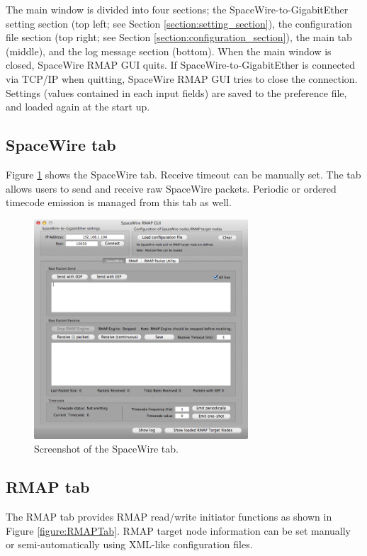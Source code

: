\documentclass[a4paper,10pt]{article}
\begin{document}
The main window is divided into four sections; the SpaceWire-to-GigabitEther setting section (top left; see Section \ref{section:setting_section}), the configuration file section (top right; see Section \ref{section:configuration_section}), the main tab (middle), and the log message section (bottom). When the main window is closed, SpaceWire RMAP GUI quits. If SpaceWire-to-GigabitEther is connected via TCP/IP when quitting, SpaceWire RMAP GUI tries to close the connection. Settings (values contained in each input fields) are saved to the preference file, and loaded again at the start up.

\subsection{SpaceWire tab}
Figure \ref{figure:SpaceWireTab} shows the SpaceWire tab.
Receive timeout can be manually set.
The tab allows users to send and receive raw SpaceWire packets.
Periodic or ordered timecode emission is managed from this tab as well.

\begin{figure}[htb]
\begin{center}
\includegraphics[width=8cm]{figures/SpaceWireRMAPGUI/Screenshot_SpaceWireTab.png}
\caption{Screenshot of the SpaceWire tab.}
\label{figure:SpaceWireTab}
\end{center}
\end{figure}

\subsection{RMAP tab}
The RMAP tab provides RMAP read/write initiator functions as shown in Figure \ref{figure:RMAPTab}.
RMAP target node information can be set manually or semi-automatically using XML-like configuration files.
\end{document}
